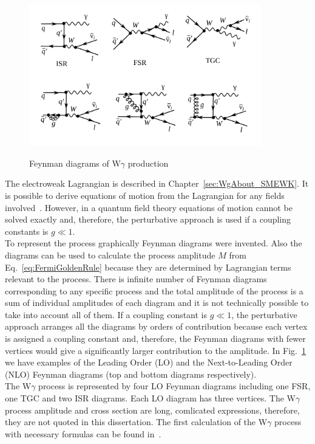 \begin{figure}[htb]
  \begin{center}
    {\includegraphics[width=0.90\textwidth]{../figs/WgAbout/feynmWg_LO_NLO.png}}
    \caption{Feynman diagrams of W$\gamma$ production}
    \label{fig:feynmWg_LO_NLO}
  \end{center}
\end{figure}

The electroweak Lagrangian is described in Chapter~\ref{sec:WgAbout_SMEWK}. It is possible to derive equations of motion from the Lagrangian for any fields involved~\cite{ref_Griffiths}. However, in a quantum field theory equations of motion cannot be solved exactly and, therefore, the perturbative approach is used if a coupling constants is $g \ll 1$.\\

To represent the process graphically Feynman diagrams were invented. Also the diagrams can be used to calculate the process amplitude $M$ from Eq.~\ref{eq:FermiGoldenRule} because they are determined by Lagrangian terms relevant to the process. There is infinite number of Feynman diagrams corresponding to any specific process and the total amplitude of the process is a sum of individual amplitudes of each diagram and it is not technically possible to take into account all of them. If a coupling constant is $g \ll 1$, the perturbative approach arranges all the diagrams by orders of contribution because each vertex is assigned a coupling constant and, therefore, the Feynman diagrams with fewer vertices would give a significantly larger contribution to the amplitude. In Fig.~\ref{fig:feynmWg_LO_NLO} we have examples of the Leading Order (LO) and the Next-to-Leading Order (NLO) Feynman diagrams (top and bottom diagrams respectively).\\

The W$\gamma$ process is represented by four LO Feynman diagrams including one FSR, one TGC and two ISR diagrams. Each LO diagram has three vertices. The W$\gamma$ process amplitude and cross section are long, comlicated expressions, therefore, they are not quoted in this dissertation. The first calculation of the W$\gamma$ process with necessary formulas can be found in~\cite{ref_theory_LO}.\\

